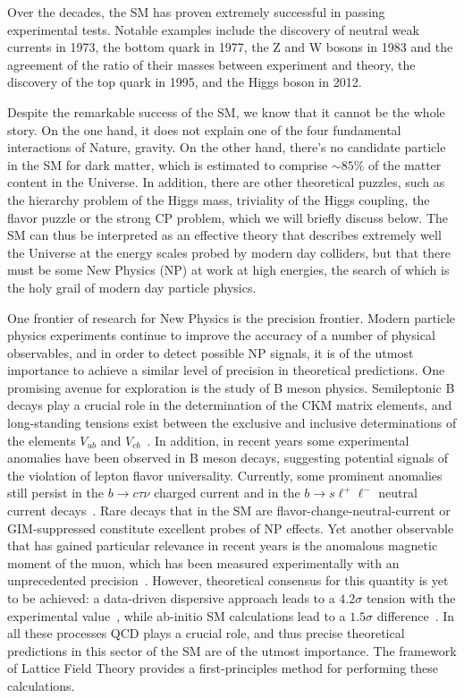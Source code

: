 Over the decades, the SM has proven extremely successful in passing experimental tests. Notable examples include the discovery of neutral weak currents in 1973, the bottom quark in 1977, the Z and W bosons in 1983 and the agreement of the ratio of their masses between experiment and theory, the discovery of the top quark in 1995, and the Higgs boson in 2012. 

Despite the remarkable success of the SM, we know that it cannot be the whole story. On the one hand, it does not explain one of the four fundamental interactions of Nature, gravity. On the other hand, there's no candidate particle in the SM for dark matter, which is estimated to comprise $\sim85\%$ of the matter content in the Universe. In addition, there are other theoretical puzzles, such as the hierarchy problem of the Higgs mass, triviality of the Higgs coupling, the flavor puzzle or the strong CP problem, which we will briefly discuss below. The SM can thus be interpreted as an effective theory that describes extremely well the Universe at the energy scales probed by modern day colliders, but that there must be some New Physics (NP) at work at high energies, the search of which is the holy grail of modern day particle physics. 

One frontier of research for New Physics is the precision frontier. Modern particle physics experiments continue to improve the accuracy of a number of physical observables, and in order to detect possible NP signals, it is of the utmost importance to achieve a similar level of precision in theoretical predictions. One promising avenue for exploration is the study of B meson physics. Semileptonic B decays play a crucial role in the determination of the CKM matrix elements, and long-standing tensions exist between the exclusive and inclusive determinations of the elements $V_{ub}$ and $V_{cb}$~\citep{Ricciardi:2019zph}. In addition, in recent years some experimental anomalies have been observed in B meson decays, suggesting potential signals of the violation of lepton flavor universality. Currently, some prominent anomalies still persist  in the  $b\to c\tau\nu$ charged current and in the  $b\to s\ell^+\ell^-$ neutral current  decays~\citep{Capdevila:2023yhq}. Rare decays that in the SM are flavor-change-neutral-current  or GIM-suppressed  constitute excellent probes of NP effects. Yet another observable that has gained particular relevance in recent years is the anomalous magnetic moment of the muon, which has been measured experimentally with an unprecedented precision~\citep{Muong-2:2006rrc,PhysRevLett.131.161802}. However, theoretical consensus for this quantity is yet to be achieved: a data-driven dispersive approach leads to a $4.2\sigma$ tension with the experimental value~\citep{Aoyama:2020ynm}, while ab-initio SM calculations lead to a $1.5\sigma$ difference~\citep{Borsanyi:2020mff,Kuberski:2024bcj}. In all these processes QCD plays a crucial role, and thus precise theoretical predictions in this sector of the SM are of the utmost importance. The framework of Lattice Field Theory provides a first-principles method for performing these calculations.

